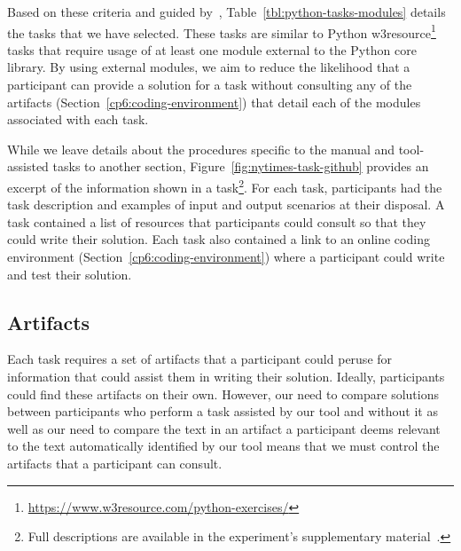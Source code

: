 Based on these criteria and guided by~\cite{thiselton2019},
Table~\ref{tbl:python-tasks-modules} details the tasks that we have selected. 
These tasks are similar to 
Python w3resource\footnote{\url{https://www.w3resource.com/python-exercises/}} tasks
that require usage of at least one module external to the Python core library.
By using external modules, we aim to reduce the likelihood that a participant 
can provide a solution for a task without consulting any of the artifacts (Section~\ref{cp6:coding-environment})
that detail each of the modules associated with each task. 



While we leave details about the procedures specific to the manual and tool-assisted tasks to another section, Figure~\ref{fig:nytimes-task-github} provides an excerpt of the information shown in a task\footnote{Full descriptions are available in the experiment's supplementary material~\red{\cite{}}.}.
For each task, participants had the task description and examples of input and output scenarios at their disposal. A task contained a list of resources that participants could consult 
so that they could write their solution.
Each task also contained a link to an online coding environment (Section~\ref{cp6:coding-environment})
where a participant could write and test their solution. 





\subsection{Artifacts}
\label{cp6:experiment-artifacts}




Each task requires a set of artifacts that a participant could peruse for information that could assist them in writing their solution.
Ideally, participants could find these artifacts on their own. However, our need to compare solutions between participants who perform a task 
assisted by our tool and without it as well as our need to compare the text in an artifact a participant deems relevant to the text
automatically identified by our tool means that we must control the artifacts that  a
participant can consult.


